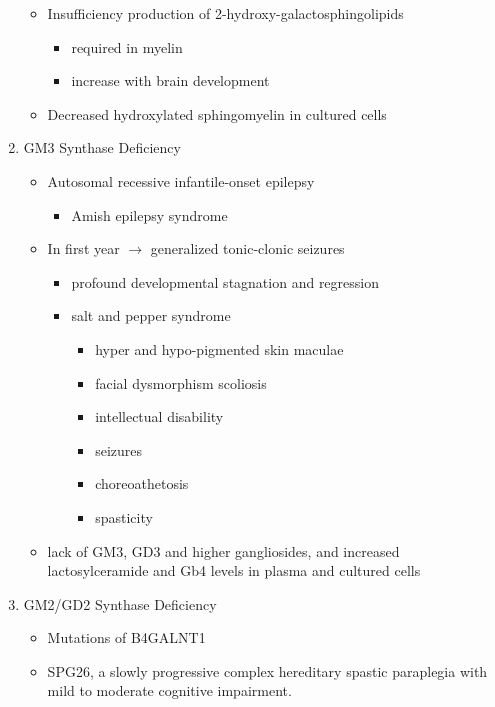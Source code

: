 \documentclass{scrartcl}
\begin{document}
\begin{enumerate}
\begin{itemize}
\item Insufficiency production of 2-hydroxy-galactosphingolipids
\begin{itemize}
\item required in myelin
\item increase with brain development
\end{itemize}

\item Decreased hydroxylated sphingomyelin in cultured cells
\end{itemize}

\item GM3 Synthase Deficiency
\label{sec:orga117bb8}

\begin{itemize}
\item Autosomal recessive infantile-onset epilepsy
\begin{itemize}
\item Amish epilepsy syndrome
\end{itemize}
\item In first year \(\to\) generalized tonic-clonic seizures
\begin{itemize}
\item profound developmental stagnation and regression
\item salt and pepper syndrome
\begin{itemize}
\item hyper and hypo-pigmented skin maculae
\item facial dysmorphism scoliosis
\item intellectual disability
\item seizures
\item choreoathetosis
\item spasticity
\end{itemize}
\end{itemize}

\item lack of GM3, GD3 and higher gangliosides, and increased
lactosylceramide and Gb4 levels in plasma and cultured cells
\end{itemize}

\item GM2/GD2 Synthase Deficiency
\label{sec:org4e1e41e}

\begin{itemize}
\item Mutations of B4GALNT1
\item SPG26, a slowly progressive complex hereditary spastic paraplegia
with mild to moderate cognitive impairment.


\end{itemize}
\end{enumerate}
\end{document}
